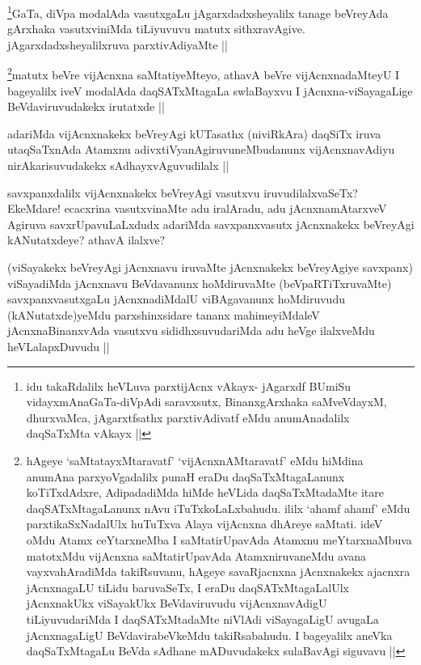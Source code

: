 \begin{artha}
\footnote{idu takaRdalilx heVLuva parxtijAcnx vAkayx- jAgarxdf BUmiSu vidayxmAnaGaTa-diVpAdi saravxsutx, BinanxgArxhaka saMveVdayxM, dhurxvaMca, jAgarxtfsathx parxtivAdivatf eMdu anumAnadalilx daqSaTxMta vAkayx ||}GaTa, diVpa modalAda vasutxgaLu jAgarxdadxsheyalilx tanage beVreyAda gArxhaka vasutxviniMda tiLiyuvuvu matutx sithxravAgive. jAgarxdadxsheyalilxruva parxtivAdiyaMte ||
\end{artha}

\begin{artha}
\footnote{hAgeye `saMtatayxMtaravatf' `vijAcnxnAMtaravatf' eMdu hiMdina anumAna parxyoVgadalilx punaH eraDu daqSaTxMtagaLanunx koTiTxdAdxre, AdipadadiMda hiMde heVLida daqSaTxMtadaMte itare daqSATxMtagaLanunx nAvu iTuTxkoLaLxbahudu. ililx `ahamf ahamf' eMdu parxtikaSxNadalUlx huTuTxva Alaya vijAcnxna dhAreye saMtati. ideV oMdu Atamx ceYtarxneMba I saMtatirUpavAda Atamxnu meYtarxnaMbuva matotxMdu vijAcnxna saMtatirUpavAda AtamxniruvaneMdu avana vayxvahAradiMda takiRsuvanu, hAgeye savaRjacnxna jAcnxnakekx ajacnxra jAcnxnagaLU tiLidu baruvaSeTx, I eraDu daqSATxMtagaLalUlx jAcnxnakUkx viSayakUkx BeVdaviruvudu vijAcnxnavAdigU tiLiyuvudariMda I daqSATxMtadaMte niVlAdi viSayagaLigU avugaLa jAcnxnagaLigU BeVdavirabeVkeMdu takiRsabahudu. I bageyalilx aneVka daqSaTxMtagaLu BeVda sAdhane mADuvudakekx sulaBavAgi siguvavu ||}matutx beVre vijAcnxna saMtatiyeMteyo, athavA beVre vijAcnxnadaMteyU I bageyalilx iveV modalAda daqSATxMtagaLa swlaBayxvu I jAcnxna-viSayagaLige BeVdaviruvudakekx irutatxde ||
\end{artha}

\begin{artha}
adariMda vijAcnxnakekx beVreyAgi kUTasathx (niviRkAra) daqSiTx iruva utaqSaTxnAda Atamxnu adivxtiVyanAgiruvuneMbudanunx vijAcnxnavAdiyu nirAkarisuvudakekx sAdhayxvAguvudilalx ||
\end{artha}

\begin{artha}
savxpanxdalilx vijAcnxnakekx beVreyAgi vasutxvu iruvudilalxvaSeTx? EkeMdare! ecacxrina vasutxvinaMte adu iralAradu, adu jAcnxnamAtarxveV Agiruva savxrUpavuLaLxdudx adariMda savxpanxvasutx jAcnxnakekx beVreyAgi kANutatxdeye? athavA ilalxve?
\end{artha}

\begin{artha}
(viSayakekx beVreyAgi jAcnxnavu iruvaMte jAcnxnakekx beVreyAgiye savxpanx) viSayadiMda jAcnxnavu BeVdavanunx hoMdiruvaMte (beVpaRTiTxruvaMte) savxpanxvasutxgaLu jAcnxnadiMdalU viBAgavanunx hoMdiruvudu (kANutatxde)yeMdu parxshinxsidare tananx mahimeyiMdaleV jAcnxnaBinanxvAda vasutxvu sididhxsuvudariMda adu heVge ilalxveMdu heVLalapxDuvudu ||
\end{artha}

